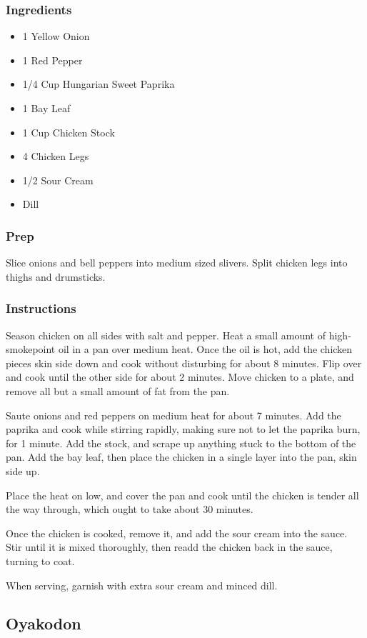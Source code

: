 \documentclass[11pt]{article}
\begin{document}
\subsubsection{Ingredients}
\label{sec:orgfcc972c}
\begin{itemize}
\item 1 Yellow Onion
\item 1 Red Pepper
\item 1/4 Cup Hungarian Sweet Paprika
\item 1 Bay Leaf
\item 1 Cup Chicken Stock
\item 4 Chicken Legs
\item 1/2 Sour Cream
\item Dill
\end{itemize}
\subsubsection{Prep}
\label{sec:orgb72bbf3}
Slice onions and bell peppers into medium sized slivers. Split
chicken legs into thighs and drumsticks.
\subsubsection{Instructions}
\label{sec:org3d1ff3d}
Season chicken on all sides with salt and pepper. Heat a small
amount of high-smokepoint oil in a pan over medium heat. Once the
oil is hot, add the chicken pieces skin side down and cook without
disturbing for about 8 minutes. Flip over and cook until the other
side for about 2 minutes. Move chicken to a plate, and remove all
but a small amount of fat from the pan.

Saute onions and red peppers on medium heat for about 7 minutes.
Add the paprika and cook while stirring rapidly, making sure not
to let the paprika burn, for 1 minute. Add the stock, and scrape
up anything stuck to the bottom of the pan. Add the bay leaf, then
place the chicken in a single layer into the pan, skin side up.

Place the heat on low, and cover the pan and cook until the
chicken is tender all the way through, which ought to take about
30 minutes.

Once the chicken is cooked, remove it, and add the sour cream into
the sauce. Stir until it is mixed thoroughly, then readd the
chicken back in the sauce, turning to coat.

When serving, garnish with extra sour cream and minced dill.
\subsection{Oyakodon}
\label{sec:org5b58547}
\end{document}
